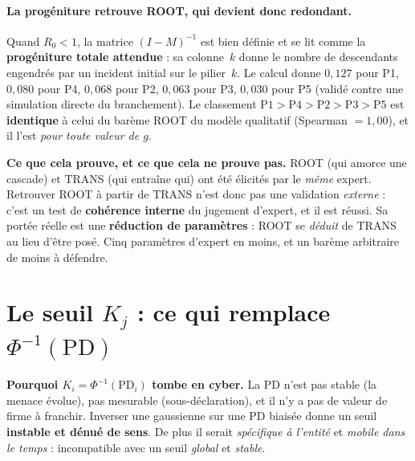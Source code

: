 \documentclass[11pt,a4paper]{article}
\begin{document}
\paragraph{La progéniture retrouve ROOT, qui devient donc redondant.} Quand $R_0<1$, la
matrice $(I-M)^{-1}$ est bien définie et se lit comme la \textbf{progéniture totale
attendue} : sa colonne~$k$ donne le nombre de descendants engendrés par un incident initial
sur le pilier~$k$. Le calcul donne $0{,}127$ pour P1, $0{,}080$ pour P4, $0{,}068$ pour P2,
$0{,}063$ pour P3, $0{,}030$ pour P5 (validé contre une simulation directe du branchement).
Le classement $\mathrm{P1} > \mathrm{P4} > \mathrm{P2} > \mathrm{P3} > \mathrm{P5}$ est
\textbf{identique} à celui du barème ROOT du modèle qualitatif (Spearman $=1{,}00$), et il
l'est \emph{pour toute valeur de $g$}.

\begin{attention}
\textbf{Ce que cela prouve, et ce que cela ne prouve pas.} ROOT (\og{}qui amorce une
cascade\fg{}) et TRANS (\og{}qui entraîne qui\fg{}) ont été élicités par le \emph{même} expert.
Retrouver ROOT à partir de TRANS n'est donc pas une validation \emph{externe} : c'est un
test de \textbf{cohérence interne} du jugement d'expert, et il est réussi. Sa portée réelle
est une \textbf{réduction de paramètres} : ROOT se \emph{déduit} de TRANS au lieu d'être
posé. Cinq paramètres d'expert en moins, et un barème arbitraire de moins à défendre.
\end{attention}

\section{Le seuil $K_j$ : ce qui remplace $\Phi^{-1}(\mathrm{PD})$}

\begin{attention}
\textbf{Pourquoi $K_i=\Phi^{-1}(\mathrm{PD}_i)$ tombe en cyber.} La PD n'est pas stable
(la menace évolue), pas mesurable (sous-déclaration), et il n'y a pas de \og{}valeur de firme\fg{}
à franchir. Inverser une gaussienne sur une PD biaisée donne un seuil \textbf{instable et
dénué de sens}. De plus il serait \emph{spécifique à l'entité} et \emph{mobile dans le temps} :
incompatible avec un seuil \emph{global} et \emph{stable}.
\end{attention}
\end{document}
